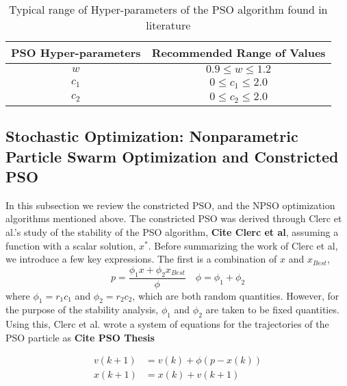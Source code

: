 \begin{table}[!htb]
\begin{center}
{\begin{tabular}{|c|c|}
	\hline
	\textbf{PSO Hyper-parameters} & \textbf{Recommended Range of Values} \\
    \hline
    $w$ & $0.9 \leq w \leq 1.2$ \\
    \hline
    $c_1$  & $0 \leq c_1 \leq 2.0$ \\
    \hline
    $c_2$  & $0 \leq c_2 \leq 2.0$ \\
    \hline  
\end{tabular}}
\caption{Typical range of Hyper-parameters of the PSO algorithm found in literature}\label{pso_hyperparam_vals}
\end{center}
\end{table}


\subsection{Stochastic Optimization: Nonparametric Particle Swarm Optimization and Constricted PSO}
In this subsection we review the constricted PSO, and the NPSO optimization algorithms mentioned above. The constricted PSO was derived through Clerc et al.'s study of the stability of the PSO algorithm, \textbf{Cite Clerc et al}, assuming a function with a scalar solution, $x^*$. Before summarizing the work of Clerc et al, we introduce a few key expressions. The first is a combination of $x$ and $x_{Best}$,
\begin{equation} \label{combined_point}
    p = \frac{\phi_1 x + \phi_2 x_{Best}}{\phi} \quad \phi = \phi_1 + \phi_2
\end{equation}
where $\phi_1 = r_1 c_1$ and $\phi_2 = r_2 c_2$, which are both random quantities. However, for the purpose of the stability analysis, $\phi_1$ and $\phi_2$ are taken to be fixed quantities. Using this, Clerc et al. wrote a system of equations for the trajectories of the PSO particle as \textbf{Cite PSO Thesis}

\begin{equation} \label{continous_pso_states_clerc}
    \begin{aligned}
        v(k+1) &= v(k) + \phi (p-x(k)) \\
        x(k+1) &= x(k) + v(k+1) 
    \end{aligned}
\end{equation}

